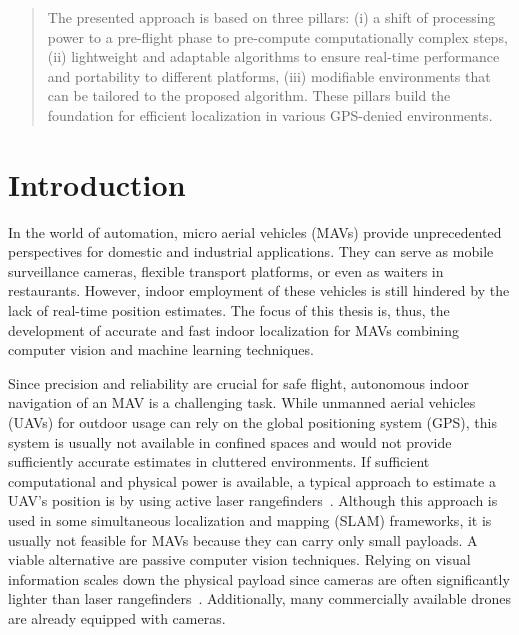 \documentclass{report}
\begin{document}
\begin{abstract}

  The presented approach is based on three pillars: (i) a shift of
  processing power to a pre-flight phase to pre-compute
  computationally complex steps, (ii) lightweight and adaptable
  algorithms to ensure real-time performance and portability to
  different platforms, (iii) modifiable environments that can be
  tailored to the proposed algorithm. These pillars build the
  foundation for efficient localization in various GPS-denied
  environments.
\end{abstract}
\chapter{Introduction}
\label{chap:introduction}

In the world of automation, micro aerial vehicles (MAVs) provide
unprecedented perspectives for domestic and industrial
applications. They can serve as mobile surveillance cameras, flexible
transport platforms, or even as waiters in restaurants. However,
indoor employment of these vehicles is still hindered by the lack of
real-time position estimates. The focus of this thesis is, thus, the
development of accurate and fast indoor localization for MAVs
combining computer vision and machine learning techniques.


Since precision and reliability are crucial for safe flight,
autonomous indoor navigation of an MAV is a challenging task. While
unmanned aerial vehicles (UAVs) for outdoor usage can rely on the
global positioning system (GPS), this system is usually not available
in confined spaces and would not provide sufficiently accurate
estimates in cluttered environments.  If sufficient computational and
physical power is available, a typical approach to estimate a UAV's
position is by using active laser
rangefinders~\cite{grzonka2009towards,bachrach2009autonomous}.
Although this approach is used in some simultaneous localization and
mapping (SLAM) frameworks, it is usually not feasible for MAVs because
they can carry only small payloads. A viable alternative are passive
computer vision techniques. Relying on visual information scales down
the physical payload since cameras are often significantly lighter
than laser
rangefinders~\cite{blosch2010vision,angeli20062d,ahrens2009vision}.
Additionally, many commercially available drones are already equipped
with cameras.
\end{document}
